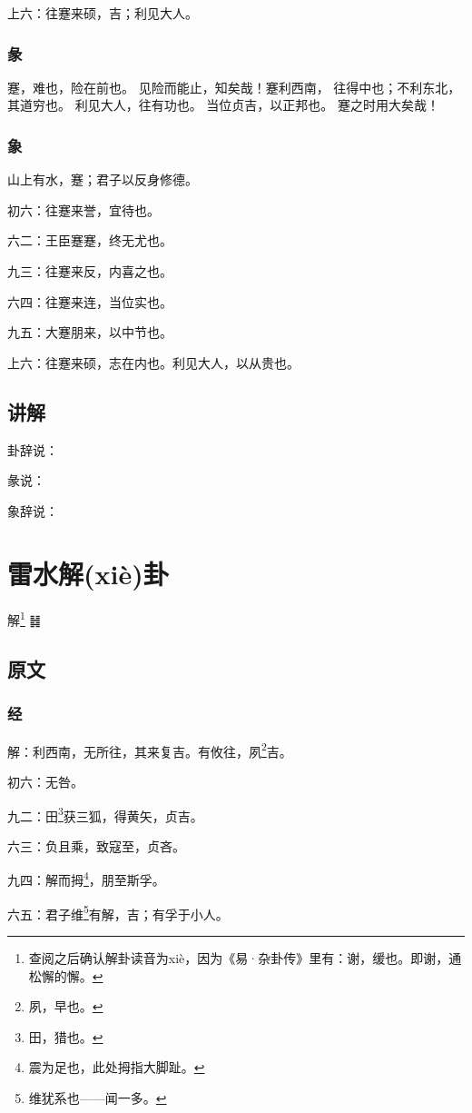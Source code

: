 \documentclass[12pt,oneside]{book}
\begin{document}
上六：往蹇来硕，吉；利见大人。

\subsection{彖}
蹇，难也，险在前也。 见险而能止，知矣哉！蹇利西南， 往得中也；不利东北，其道穷也。 利见大人，往有功也。 当位贞吉，以正邦也。 蹇之时用大矣哉！

\subsection{象}
山上有水，蹇；君子以反身修德。

初六：往蹇来誉，宜待也。

六二：王臣蹇蹇，终无尤也。

九三：往蹇来反，内喜之也。

六四：往蹇来连，当位实也。

九五：大蹇朋来，以中节也。

上六：往蹇来硕，志在内也。利见大人，以从贵也。

\section{讲解}
卦辞说：

彖说：

象辞说：

\chapter{雷水解(xiè)卦}
解\footnote{查阅之后确认解卦读音为xiè，因为《易·杂卦传》里有：谢，缓也。即谢，通松懈的懈。} {\Large ䷧}

\section{原文}

\subsection{经}
解：利西南，无所往，其来复吉。有攸往，夙\footnote{夙，早也。}吉。

初六：无咎。

九二：田\footnote{田，猎也。}获三狐，得黄矢，贞吉。

六三：负且乘，致寇至，贞吝。

九四：解而拇\footnote{震为足也，此处拇指大脚趾。}，朋至斯孚。

六五：君子维\footnote{维犹系也——闻一多。}有解，吉；有孚于小人。
\end{document}
